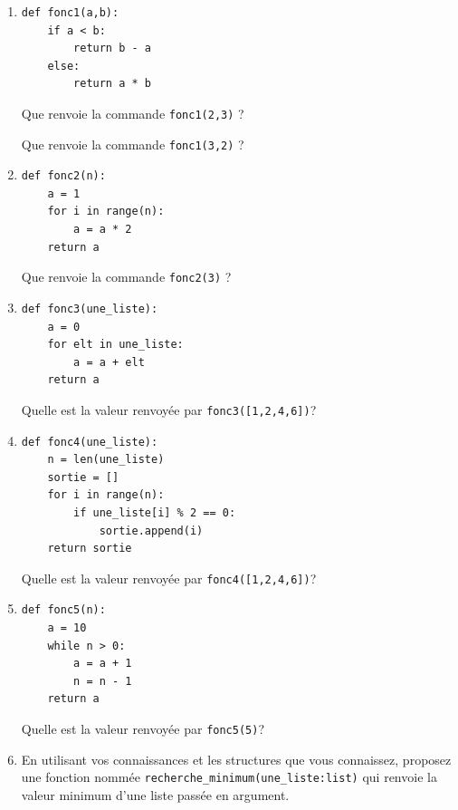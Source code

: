 \documentclass[a4paper,12pt,openany]{book}
\begin{document}
\begin{enumerate}
	\item 
	
	\begin{lstlisting}[numbers=none]
def fonc1(a,b):
    if a < b:
        return b - a
    else:
        return a * b
\end{lstlisting}
	
	Que renvoie la commande \verb+fonc1(2,3)+ ? \dotfill
	
	\medskip
	
		Que renvoie la commande \verb+fonc1(3,2)+ ? \dotfill

	\item 
	\begin{lstlisting}[numbers=none]
def fonc2(n):
    a = 1
    for i in range(n):
        a = a * 2
    return a
\end{lstlisting}
	
	Que renvoie la commande \verb+fonc2(3)+ ? \dotfill

	\medskip
	
	\item 
	\begin{lstlisting}[numbers=none]
def fonc3(une_liste):
    a = 0
    for elt in une_liste:
        a = a + elt
    return a
\end{lstlisting}
	
	Quelle est la valeur renvoyée par \verb+fonc3([1,2,4,6])+? \dotfill

	\medskip
	
	\item 
	\begin{lstlisting}[numbers=none]
def fonc4(une_liste):
    n = len(une_liste)
    sortie = []
    for i in range(n):
        if une_liste[i] % 2 == 0:
            sortie.append(i)
    return sortie
\end{lstlisting}
	
	Quelle est la valeur renvoyée par \verb+fonc4([1,2,4,6])+? \dotfill
	
	\medskip
	
	\item 
	\begin{lstlisting}[numbers=none]
def fonc5(n):
    a = 10
    while n > 0:
        a = a + 1
        n = n - 1
    return a
\end{lstlisting}
	
	Quelle est la valeur renvoyée par \verb+fonc5(5)+? \dotfill
	
	
	\newpage
	
	\item En utilisant vos connaissances et les structures que vous connaissez, proposez une fonction nommée \verb+recherche_minimum(une_liste:list)+ qui renvoie la valeur minimum d'une liste passée en argument.
	

\end{enumerate}
\end{document}
